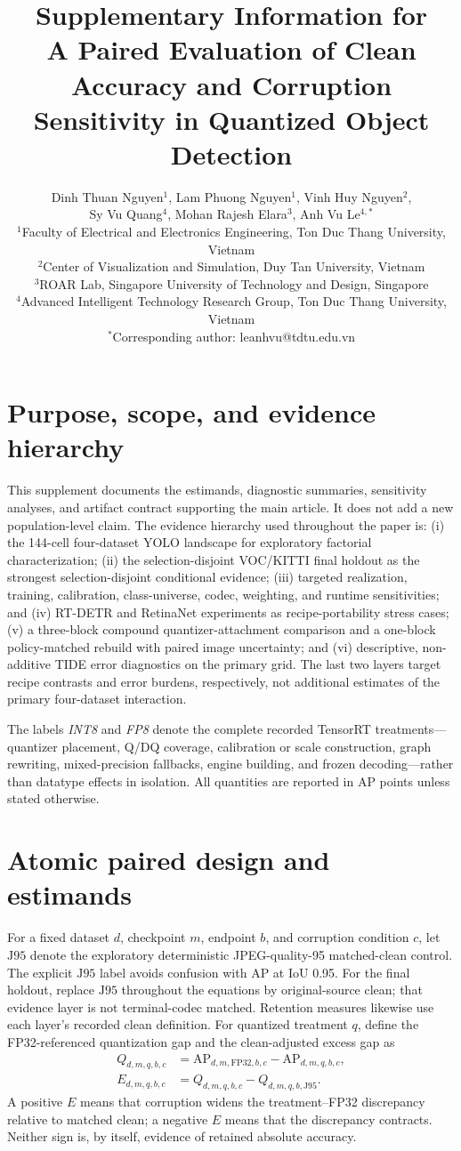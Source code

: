 \documentclass[10pt]{article}
\title{Supplementary Information for\\[1mm]
\textbf{A Paired Evaluation of Clean Accuracy and Corruption Sensitivity in Quantized Object Detection}}
\author{Dinh Thuan Nguyen$^{1}$, Lam Phuong Nguyen$^{1}$, Vinh Huy Nguyen$^{2}$,\\
Sy Vu Quang$^{4}$, Mohan Rajesh Elara$^{3}$, Anh Vu Le$^{4,*}$\\[2mm]
\small $^1$Faculty of Electrical and Electronics Engineering, Ton Duc Thang University, Vietnam\\
\small $^2$Center of Visualization and Simulation, Duy Tan University, Vietnam\\
\small $^3$ROAR Lab, Singapore University of Technology and Design, Singapore\\
\small $^4$Advanced Intelligent Technology Research Group, Ton Duc Thang University, Vietnam\\
\small $^*$Corresponding author: leanhvu@tdtu.edu.vn}
\date{}
\newcommand{\AP}{\mathrm{AP}}
\newcommand{\Jclean}{\mathrm{J95}}
\begin{document}
\maketitle

\section{Purpose, scope, and evidence hierarchy}

This supplement documents the estimands, diagnostic summaries, sensitivity
analyses, and artifact contract supporting the main article. It does not add a
new population-level claim. The evidence hierarchy used throughout the paper is:
(i) the 144-cell four-dataset YOLO landscape for exploratory factorial
characterization; (ii) the selection-disjoint VOC/KITTI final holdout as the strongest
selection-disjoint conditional evidence; (iii) targeted realization, training,
calibration, class-universe, codec, weighting, and runtime sensitivities; and
(iv) RT-DETR and RetinaNet experiments as recipe-portability stress cases;
(v) a three-block compound quantizer-attachment comparison and a one-block
policy-matched rebuild with paired image uncertainty;
and (vi) descriptive, non-additive TIDE error diagnostics on the primary grid.
The last two layers target recipe contrasts and error burdens, respectively,
not additional estimates of the primary four-dataset interaction.

The labels \emph{INT8} and \emph{FP8} denote the complete recorded TensorRT
treatments---quantizer placement, Q/DQ coverage, calibration or scale
construction, graph rewriting, mixed-precision fallbacks, engine building, and
frozen decoding---rather than datatype effects in isolation. All quantities are
reported in AP points unless stated otherwise.

\section{Atomic paired design and estimands}

For a fixed dataset $d$, checkpoint $m$, endpoint $b$, and corruption condition
$c$, let $\Jclean$ denote the exploratory deterministic JPEG-quality-95 matched-clean control. The explicit $\Jclean$ label avoids confusion with AP at IoU 0.95. For the final holdout, replace $\Jclean$ throughout the equations by original-source clean; that evidence layer is not terminal-codec matched. Retention measures likewise use each layer's recorded clean definition.
For quantized treatment $q$, define the FP32-referenced quantization gap and the
clean-adjusted excess gap as
\begin{align}
Q_{d,m,q,b,c}
 &= \AP_{d,m,\mathrm{FP32},b,c}-\AP_{d,m,q,b,c},\\
E_{d,m,q,b,c}
 &= Q_{d,m,q,b,c}-Q_{d,m,q,b,\Jclean}.
\end{align}
A positive $E$ means that corruption widens the treatment--FP32 discrepancy
relative to matched clean; a negative $E$ means that the discrepancy contracts.
Neither sign is, by itself, evidence of retained absolute accuracy.
\end{document}
